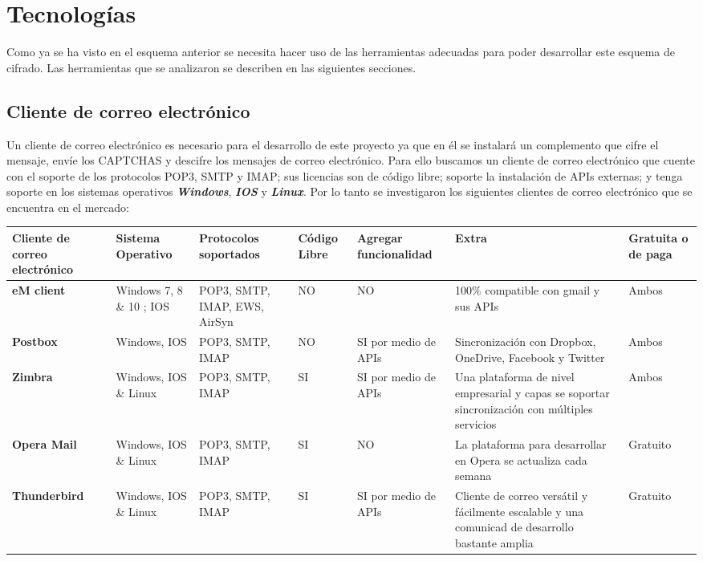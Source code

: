 \documentclass[12pt,oneside,onecolumn,openany]{report}
\begin{document}
\section{Tecnologías}
Como ya se ha visto en el esquema anterior se necesita hacer uso de las herramientas adecuadas para poder desarrollar este esquema de cifrado. Las herramientas que se analizaron se describen en las siguientes secciones.\\
\subsection{Cliente de correo electrónico}
Un cliente de correo electrónico es necesario para el desarrollo de este proyecto ya que en él se instalará un complemento que cifre el mensaje, envíe los CAPTCHAS y descifre los mensajes de correo electrónico. Para ello buscamos un cliente de correo electrónico que cuente con el soporte de los protocolos POP3, SMTP y IMAP; sus licencias son de código libre; soporte la instalación de APIs externas; y tenga soporte en los sistemas operativos \textbf{\textit{Windows}}, \textbf{\textit{IOS}} y \textbf{\textit{Linux}}. Por lo tanto se investigaron los siguientes clientes de correo electrónico que se encuentra en el mercado: \\
\begin{longtable}[H]{| p{} | p{2cm} |p{2cm}|p{}|p{2cm}|p{3cm}|p{2cm}|}%
 \hline
 \textbf{Cliente de correo electrónico}&\textbf{Sistema Operativo}&\textbf{Protocolos soportados}&\textbf{Código Libre}&\textbf{Agregar funcionalidad}&\textbf{Extra}&\textbf{Gratuita o de paga}\\
 \hline
 \textbf{eM client}&Windows 7, 8 \& 10 ; IOS&POP3, SMTP, IMAP, EWS, AirSyn&NO&NO&100\% compatible con gmail y sus APIs&Ambos\\
 \hline
 \textbf{Postbox}&Windows, IOS&POP3, SMTP, IMAP&NO&SI por medio de APIs&Sincronización con Dropbox, OneDrive, Facebook y Twitter&Ambos\\
 \hline
 \textbf{Zimbra}&Windows, IOS \& Linux&POP3, SMTP, IMAP&SI&SI por medio de APIs&Una plataforma de nivel empresarial y capas se soportar sincronización con múltiples servicios&Ambos\\
 \hline
 \textbf{Opera Mail}&Windows, IOS \& Linux&POP3, SMTP, IMAP&SI&NO&La plataforma para desarrollar en Opera se actualiza cada semana&Gratuito\\
 \hline
 \textbf{Thunderbird}&Windows, IOS \& Linux&POP3, SMTP, IMAP&SI&SI por medio de APIs&Cliente de correo versátil y fácilmente escalable y una comunicad de desarrollo bastante amplia&Gratuito\\
\end{longtable}
\end{document}
